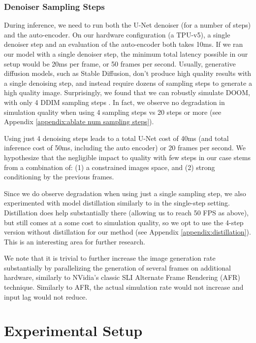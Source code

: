 \documentclass{article} %
\begin{document}
\subsubsection{Denoiser Sampling Steps}

During inference, we need to run both the U-Net denoiser (for a number of steps) and the auto-encoder.
On our hardware configuration (a TPU-v5), a single denoiser step and an evaluation of the auto-encoder both takes 10ms.
If we ran our model with a single denoiser step, the minimum total latency possible in our setup would be 20ms per frame, or 50 frames per second.
Usually, generative diffusion models, such as Stable Diffusion, don't produce high quality results with a single denoising step, and instead require dozens of sampling steps to generate a high quality image.
Surprisingly, we found that we can robustly simulate DOOM,
with only 4 DDIM sampling steps \citep{song2020denoising}.
In fact, we observe no degradation in simulation quality when using 4 sampling steps vs 20 steps or more (see Appendix \ref{appendix:ablate num sampling steps}).

Using just 4 denoising steps leads to a total U-Net cost of 40ms (and total inference cost of 50ms, including the auto encoder) or 20 frames per second.
We hypothesize that the negligible impact to quality with few steps in our case stems from a combination of: (1) a constrained images space, and (2) strong conditioning by the previous frames.

Since we do observe degradation when using just a single sampling step, we also experimented with model distillation similarly to \citep{yin2024onestep,wang2023prolificdreamer} in the single-step setting.
Distillation does help substantially there (allowing us to reach 50 FPS as above), but still comes at a some cost to simulation quality, so we opt to use the 4-step version without distillation for our method (see Appendix \ref{appendix:distillation}). This is an interesting area for further research.

We note that it is trivial to further increase the image generation rate substantially by parallelizing the generation of several frames on additional hardware, similarly to NVidia's classic SLI Alternate Frame Rendering (AFR) technique. Similarly to AFR, the actual simulation rate would not increase and input lag would not reduce.


\section{Experimental Setup}
\label{experimental_setup}
\end{document}
